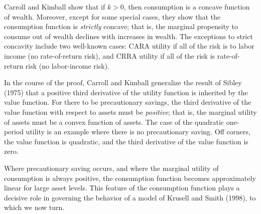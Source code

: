  Carroll and Kimball show that
if $k >0$, then consumption is a concave function of
wealth. Moreover, except for some special cases, they
show that the consumption function is {\it strictly\/} concave;
that is, the marginal propensity to consume out of wealth declines with
increases in wealth. The exceptions to strict concavity include
two well-known cases: CARA utility if all of the risk is to labor
income (no rate-of-return risk), and CRRA utility if all of
the risk is rate-of-return risk (no labor-income risk).

In the course of the proof, Carroll and Kimball generalize the
result of Sibley (1975) that a positive third derivative of the
utility function is inherited by the value function. For there to
be precautionary savings, the third derivative of the value
function with respect to assets must be {\it positive\/}; that is,
the marginal utility of assets must be a convex function of
assets.  The case of the quadratic one-period utility is an example
where  there is no precautionary saving.  Off corners, the value
function is quadratic, and the third derivative of the value
function is zero.

Where precautionary saving occurs, and where the marginal utility of
consumption is  always positive, the consumption function becomes
approximately linear for large asset levels.
  This feature of the consumption function plays a decisive role
in governing the behavior of a model of Krusell and Smith (1998),
to which we now turn.



